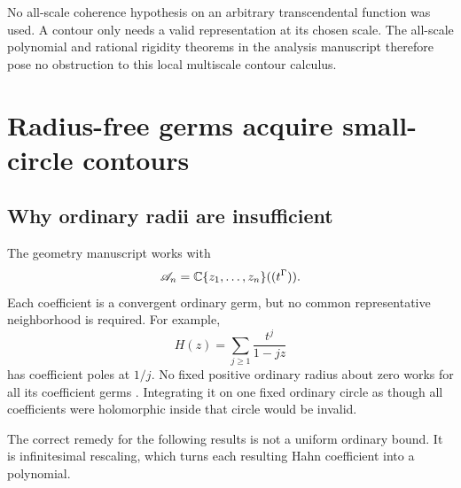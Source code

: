 \documentclass[11pt,letterpaper]{article}
\theoremstyle{definition}
\theoremstyle{remark}
\newcommand{\C}{\mathbb C}\newcommand{\R}{\mathbb R}\newcommand{\Q}{\mathbb Q}\newcommand{\Z}{\mathbb Z}\newcommand{\N}{\mathbb N}
\numberwithin{equation}{section}
\begin{document}
No all-scale coherence hypothesis on an arbitrary transcendental function was used. A contour only needs a valid representation at its chosen scale. The all-scale polynomial and rational rigidity theorems in the analysis manuscript therefore pose no obstruction to this local multiscale contour calculus.

\section{Radius-free germs acquire small-circle contours}\label{sec:radiusfree}
\subsection{Why ordinary radii are insufficient}
The geometry manuscript works with
\[
 \A_n=\C\{z_1,\ldots,z_n\}((t^\Gamma)).
\]
Each coefficient is a convergent ordinary germ, but no common representative neighborhood is required. For example,
\begin{equation}\label{eq:noradius}
 H(z)=\sum_{j\ge1}\frac{t^j}{1-jz}
\end{equation}
has coefficient poles at $1/j$. No fixed positive ordinary radius about zero works for all its coefficient germs \cite[example on a shared ordinary neighborhood]{Geometry}. Integrating it on one fixed ordinary circle as though all coefficients were holomorphic inside that circle would be invalid.

The correct remedy for the following results is not a uniform ordinary bound. It is infinitesimal rescaling, which turns each resulting Hahn coefficient into a polynomial.
\end{document}
